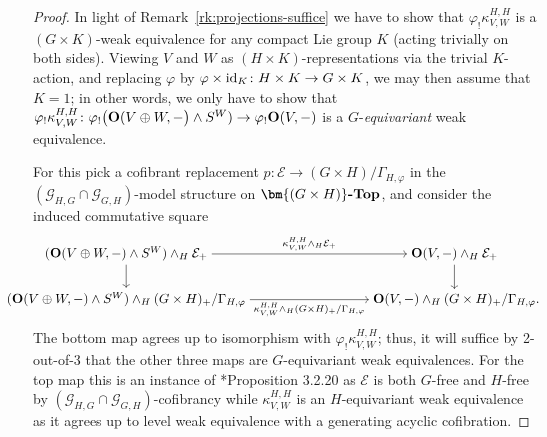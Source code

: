 \documentclass[reqno]{memo-l}
\theoremstyle{mythm}
\theoremstyle{definition}
\numberwithin{equation}{section}
\newcommand{\Ee}{{\mathcal{E}}}
\renewcommand{\phi}{\varphi}
\newcommand{\cat}[1]{\textbf{\textup{#1}}}
\newcommand{\id}{\textup{id}}
\let\smashp=\wedge
\begin{document}
\begin{proof}
    In light of Remark~\ref{rk:projections-suffice} we have to show that $\phi_!\kappa_{V,W}^{H,H}$ is a $(G\times K)$-weak equivalence for any compact Lie group $K$ (acting trivially on both sides). Viewing $V$ and $W$ as $(H\times K)$-representations via the trivial $K$-action, and replacing $\phi$ by $\phi\times\id_K\colon H\times K\to G\times K$, we may then assume that $K=1$; in other words, we only have to show that 
    $\phi_!\kappa_{V,W}^{H,H}\colon \phi_!\big(\cat{O}(V\oplus W,{-}\big)\smashp S^W)\to \phi_!\cat{O}(V,-)$
    is a $G$-\emph{equivariant} weak equivalence.
    
    For this pick a cofibrant replacement $p\colon\Ee\to (G\times H)/\Gamma_{H,\phi}$ in the ${(\mathcal G_{H,G}\cap\mathcal G_{G,H})}$-model structure on $\cat{$\bm{(G\times H)}$-Top}$, and consider the induced commutative square
    \[\hskip-20.56pt\hfuzz=20.57pt
        \begin{tikzcd}[cramped]
            (\cat{O}(V\oplus W,-)\smashp S^W) \smashp_H \Ee_+\arrow[d]\arrow[r, "\kappa_{V,W}^{H,H}\smashp_H\Ee_+"] &[6.66em] \cat{O}(V,-)\smashp_H \Ee_+\arrow[d]\\
            (\cat{O}(V\oplus W,-)\smashp S^W) \smashp_H (G\times H)_+/\Gamma_{H,\phi} \arrow[r, "\kappa_{V,W}^{H,H}\smashp_H(G\times H)_+/\Gamma_{H,\phi}"'] & \cat{O}(V,-)\smashp_H (G\times H)_+/\Gamma_{H,\phi}\rlap.
        \end{tikzcd}
    \]
    The bottom map agrees up to isomorphism with $\phi_!\kappa_{V,W}^{H,H}$; thus, it will suffice by 2-out-of-3 that the other three maps are $G$-equivariant weak equivalences. For the top map this is an instance of \cite{schwede2018global}*{Proposition 3.2.20} as $\Ee$ is both $G$-free and $H$-free by $(\mathcal G_{H,G}\cap\mathcal G_{G,H})$-cofibrancy while $\kappa_{V,W}^{H,H}$ is an $H$-equivariant weak equivalence as it agrees up to level weak equivalence with a generating acyclic cofibration.
    

\end{proof}
\end{document}
